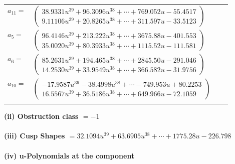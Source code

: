 \documentclass[1p]{elsarticle_modified}
\theoremstyle{definition}
\begin{document}
\begin{tabular}{m{7pt} m{180pt} m{7pt} m{180pt} }
\flushright $a_{11}=$&$\begin{pmatrix}38.9331 u^{39}+96.3096 u^{38}+\cdots+769.052 u-55.4517\\9.11106 u^{39}+20.8265 u^{38}+\cdots+311.597 u-33.5123\end{pmatrix}$ \\
\flushright $a_{5}=$&$\begin{pmatrix}96.4146 u^{39}+213.222 u^{38}+\cdots+3675.88 u-401.553\\35.0020 u^{39}+80.3933 u^{38}+\cdots+1115.52 u-111.581\end{pmatrix}$ \\
\flushright $a_{6}=$&$\begin{pmatrix}85.2631 u^{39}+194.465 u^{38}+\cdots+2845.50 u-291.046\\14.2530 u^{39}+33.9549 u^{38}+\cdots+366.582 u-31.9756\end{pmatrix}$ \\
\flushright $a_{10}=$&$\begin{pmatrix}-17.9587 u^{39}-38.4998 u^{38}+\cdots-749.953 u+80.2253\\16.5567 u^{39}+36.5186 u^{38}+\cdots+649.966 u-72.1059\end{pmatrix}$\\&\end{tabular}
\flushleft \textbf{(ii) Obstruction class $= -1$}\\~\\
\flushleft \textbf{(iii) Cusp Shapes $= 32.1094 u^{39}+63.6905 u^{38}+\cdots+1775.28 u-226.798$}\\~\\
\newpage\renewcommand{\arraystretch}{1}
\flushleft \textbf{(iv) u-Polynomials at the component}\newline \\
\end{document}
